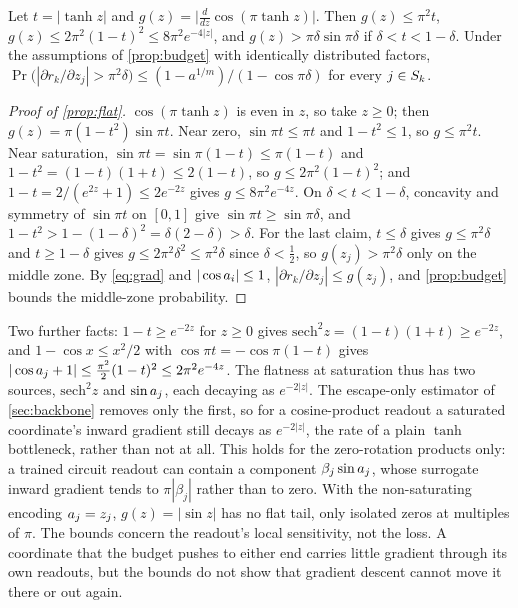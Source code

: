 \begin{proposition}\label{prop:flat}
Let $t=|\tanh z|$ and $g(z)=\big|\tfrac{d}{dz}\cos(\pi\tanh z)\big|$. Then $g(z)\le\pi^2t$,
$g(z)\le2\pi^2(1-t)^2\le8\pi^2e^{-4|z|}$, and $g(z)>\pi\delta\sin\pi\delta$ if $\delta<t<1-\delta$.
Under the assumptions of \cref{prop:budget} with identically distributed factors,
$\Pr\big(|\partial r_k/\partial z_j|>\pi^2\delta\big)\le(1-a^{1/m})/(1-\cos\pi\delta)$ for every $j\in S_k$.
\end{proposition}
\begin{proof}[Proof of \cref{prop:flat}]
$\cos(\pi\tanh z)$ is even in $z$, so take $z\ge0$; then $g(z)=\pi(1-t^2)\sin\pi t$. Near zero,
$\sin\pi t\le\pi t$ and $1-t^2\le1$, so $g\le\pi^2t$. Near saturation, $\sin\pi t=\sin\pi(1-t)\le\pi(1-t)$ and
$1-t^2=(1-t)(1+t)\le2(1-t)$, so $g\le2\pi^2(1-t)^2$; and $1-t=2/(e^{2z}+1)\le2e^{-2z}$ gives
$g\le8\pi^2e^{-4z}$. On $\delta<t<1-\delta$, concavity and symmetry of $\sin\pi t$ on $[0,1]$ give
$\sin\pi t\ge\sin\pi\delta$, and $1-t^2>1-(1-\delta)^2=\delta(2-\delta)>\delta$. For the last claim,
$t\le\delta$ gives $g\le\pi^2\delta$ and $t\ge1-\delta$ gives $g\le2\pi^2\delta^2\le\pi^2\delta$ since $\delta<\tfrac12$,
so $g(z_j)>\pi^2\delta$ only on the middle zone. By \cref{eq:grad} and $|\cos a_{i}|\le1$,
$|\partial r_k/\partial z_j|\le g(z_j)$, and \cref{prop:budget} bounds the middle-zone probability.
\end{proof}
Two further facts: $1-t\ge e^{-2z}$ for $z\ge0$ gives $\mathrm{sech}^2z=(1-t)(1+t)\ge e^{-2z}$,
and $1-\cos x\le x^2/2$ with $\cos\pi t=-\cos\pi(1-t)$ gives $|\cos a_{j}+1|\le\tfrac{\pi^2}{2}(1-t)^2\le2\pi^2e^{-4z}$.
The flatness at saturation thus has two sources, $\mathrm{sech}^2z$ and $\sin a_{j}$, each decaying as
$e^{-2|z|}$. The escape-only estimator of \cref{sec:backbone} removes only the first, so for a cosine-product readout a saturated coordinate's inward gradient still
decays as $e^{-2|z|}$, the rate of a plain $\tanh$ bottleneck, rather than not at all. This holds for the zero-rotation products only: a trained
circuit readout can contain a component $\beta_j\sin a_{j}$, whose surrogate inward gradient tends to $\pi|\beta_j|$ rather than to zero. With the non-saturating encoding $a_{j}=z_j$, $g(z)=|\sin z|$ has no flat tail,
only isolated zeros at multiples of $\pi$. The bounds concern the readout's local sensitivity, not the loss.
A coordinate that the budget pushes to either end carries little gradient through its own readouts, but
the bounds do not show that gradient descent cannot move it there or out again.

